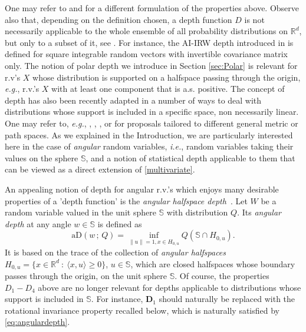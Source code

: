 \documentclass{article}
\numberwithin{equation}{section}
\newcommand{\rset}{\mathbb{R}}
\newcommand{\sphere}{\mathbb{S}}
\newcommand{\AHS}[1]{H_{0, {#1}} }
\newcommand{\aD}[2]{{\mathrm{aD}}\left({#1}\,;\,{#2}\right)}
\begin{document}
One may refer to \cite{Dyckerhoff04} and \cite{Mosler13} for a
different formulation of the properties above. Observe also that,
depending on the definition chosen, a depth function $D$ is not
necessarily applicable to the whole ensemble of all probability
distributions on $\mathbb{R}^d$, but only to a subset of it, see
\cite{mosler2022choosing}. For instance, the AI-IRW depth introduced
in \cite{10.1214/23-EJS2189} is defined for square integrable random
vectors with invertible covariance matrix only. The notion of
polar depth we introduce in Section \ref{sec:Polar} is
relevant for r.v's $X$ whose distribution is supported on a
halfspace passing through the origin, \textit{e.g.}, r.v.'s $X$ with
at least one component that is a.s. positive. The concept of depth
has also been recently adapted in a number of ways to deal with
distributions whose support is included in a specific space, non
necessarily linear. One may refer to, \textit{e.g.},
\cite{NagyGijbels2016}, \cite{StaermanMozharovskyiClemencon2020},
\cite{virta2023spatial}, \cite{LafayeDeMicheauxMV20} or \cite{FernandezClemencon2025} for
proposals tailored to different general metric or path spaces. As we
explained in the Introduction, we are particularly interested here in
the case of \textit{angular} random variables, \textit{i.e.}, random
variables taking their values on the sphere $\sphere$, and a notion of
statistical depth applicable to them that can be viewed as a direct
extension of \eqref{multivariate}.
\medskip

An appealing notion of depth for angular r.v.'s which enjoys many
desirable properties of a 'depth function' is the \textit{angular
    halfspace
depth}~\citep{NagyDemniButtarazziPorzio2023,nagy2024theoretical}. Let
$W$ be a random variable valued in the unit sphere $\sphere$
with distribution $Q$. Its \emph{angular depth} at any angle $w\in
\sphere$ is defined as
\begin{equation}
    \label{eq:angulardepth}
    \aD{w}{Q} = \inf_{\|u\| = 1, x \in \AHS{u}} Q( \sphere\cap \AHS{u}).
\end{equation}
It is based on the trace of the collection of \emph{angular
halfspaces} $\AHS{u} = \{x\in\rset^d~:~ \langle x, u\rangle \ge 0\}$, $u\in \sphere$, which are closed halfspaces whose
boundary passes through the  origin, on the unit sphere
$\sphere$. Of course, the properties $D_1-D_4$ above are no
longer relevant for depths applicable to distributions whose support
is included in $\sphere$. For instance,
$\mathbf{D}_1$ should naturally be replaced with the rotational
invariance property recalled below, which is naturally satisfied by
\eqref{eq:angulardepth}.
\end{document}
